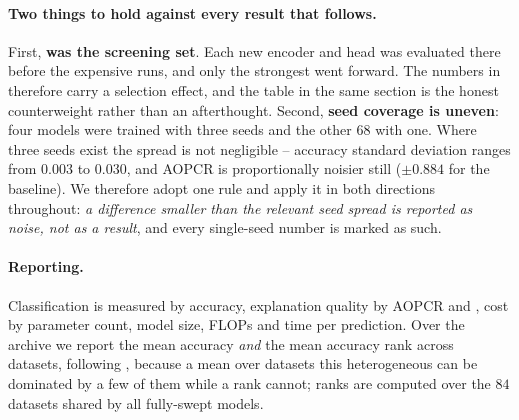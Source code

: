 \paragraph{Two things to hold against every result that follows.}
First, \textbf{\webtraffic{} was the screening set}. Each new encoder and head was evaluated there
before the expensive \ucr{} runs, and only the strongest went forward. The \webtraffic{} numbers in
 therefore carry a selection effect, and the \ucr{} table in the same section is the
honest counterweight rather than an afterthought. Second, \textbf{seed coverage is uneven}: four
models were trained with three seeds and the other $68$ with one. Where three seeds exist the spread
is not negligible -- accuracy standard deviation ranges from $0.003$ to $0.030$, and AOPCR is
proportionally noisier still ($\pm 0.884$ for the baseline). We therefore adopt one rule and apply it
in both directions throughout: \emph{a difference smaller than the relevant seed spread is reported
as noise, not as a result}, and every single-seed number is marked as such.

\paragraph{Reporting.}
Classification is measured by accuracy, explanation quality by AOPCR and \ndcg{}, cost by parameter
count, model size, FLOPs and time per prediction. Over the \ucr{} archive we report the mean accuracy
\emph{and} the mean accuracy rank across datasets, following \citet{demsar2006statistical}, because a
mean over datasets this heterogeneous can be dominated by a few of them while a rank cannot; ranks
are computed over the $84$ datasets shared by all fully-swept models.
